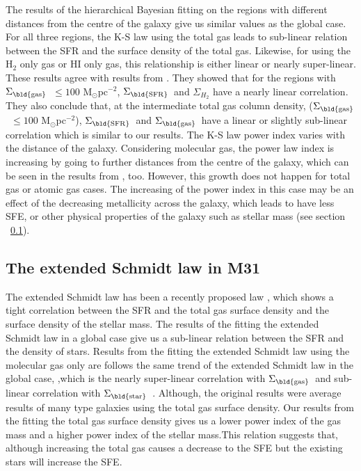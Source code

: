 \documentclass[useAMS,usenatbib]{mn2e}
\newcommand \sigmagas    {$\Sigma_{\rm \bld {gas }} $\ }
\newcommand \sigmasfr     {$\Sigma_{\rm \bld {SFR }} $\ }
\newcommand \sigmastar    {$\Sigma_{\rm \bld {star }} $\ }
\newcommand \eqnprime {N^\prime}
\begin{document}
The results of the hierarchical Bayesian fitting on the regions with different distances from the centre of the galaxy give us similar values as the global case. For all three regions, the K-S law using the total gas leads to sub-linear relation between the SFR and the surface density of the total gas. Likewise, for using the H$_{2}$ only gas or HI only gas, this relationship is either linear or nearly super-linear. These results agree with results from \cite{Krumholz09}. They showed that for the regions with \sigmagas $\leq 100$ M$_{\odot}$pc$^{-2}$, \sigmasfr and $\Sigma_{H_2}$ have a nearly linear correlation. They also conclude that, at the intermediate total gas column density, (\sigmagas $\leq 100$ M$_{\odot}$pc$^{-2}$), \sigmasfr and \sigmagas have a linear or slightly sub-linear correlation which is similar to our results. The K-S law power index varies with the distance of the galaxy. Considering molecular gas, the power law index is increasing by going to further distances from the centre of the galaxy, which can be seen in the results from \cite{Ford13}, too. However, this growth does not happen for total gas or atomic gas cases. The increasing of the power index in this case may be an effect of the decreasing metallicity across the galaxy, which leads to have less SFE, or other physical properties of the galaxy such as stellar mass (see section ~\ref{sec:es_res}).
  
\subsection{The extended Schmidt law in M31}
\label{sec:es_res}
The extended Schmidt law has been a recently proposed law \citep{Shi11}, which shows a tight correlation between the SFR and the total gas surface density and the surface density of the stellar mass. The results of the fitting the extended Schmidt law in a global case give us a sub-linear relation between the SFR and the density of stars. Results from the fitting the extended Schmidt law using the molecular gas only are %
follows the same trend of the extended Schmidt law in the global case,%
,which is the nearly super-linear correlation with \sigmagas and sub-linear correlation with \sigmastar. Although, the original results were average results of many type galaxies using the total gas surface density. Our results from the fitting the total gas surface density gives us a lower power index of the gas mass and a higher power index of the stellar mass.This relation suggests that, although increasing the total gas causes a decrease to the SFE but the existing stars will increase the SFE. 
\end{document}
